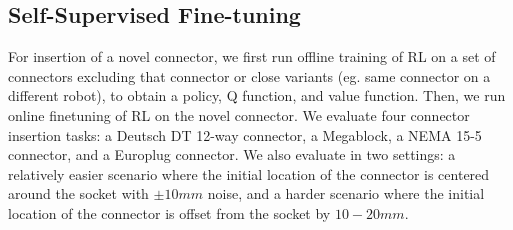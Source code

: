 



\subsection{Self-Supervised Fine-tuning}

For insertion of a novel connector, we first run offline training of RL on a set of connectors excluding that connector or close variants (eg. same connector on a different robot), to obtain a policy, Q function, and value function.
Then, we run online finetuning of RL on the novel connector.
We evaluate four connector insertion tasks: a Deutsch DT 12-way connector, a Megablock, a NEMA 15-5 connector, and a Europlug connector.
We also evaluate in two settings: a relatively easier scenario where the initial location of the connector is centered around the socket with $\pm10mm$ noise, and a harder scenario where the initial location of the connector is offset from the socket by $10-20mm$.

